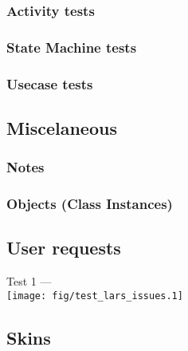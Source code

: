   \subsubsection{Activity tests}

  \subsubsection{State Machine tests}

  \subsubsection{Usecase tests}

\subsection{Miscelaneous}
  \subsubsection{Notes}
  \subsubsection{Objects (Class Instances)}

\subsection{User requests}
  Test 1 --- \\ \texttt{[image: fig/test\_lars\_issues.1]} \\

\subsection{Skins}
